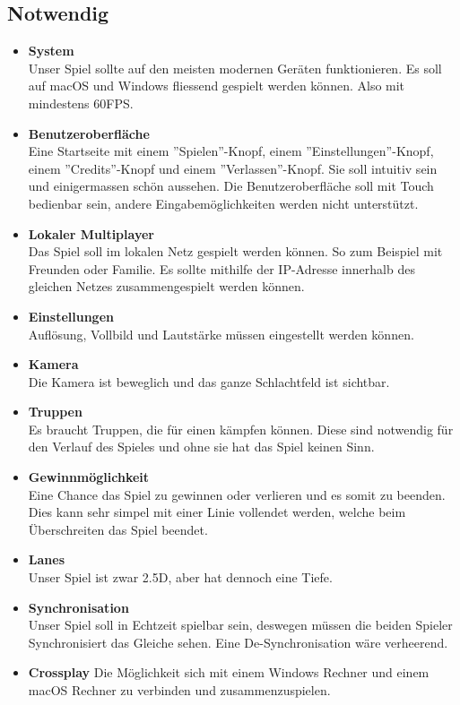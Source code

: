 \subsection{Notwendig}
\begin{itemize}
    \item \textbf{System} \\
        Unser Spiel sollte auf den meisten modernen Geräten funktionieren. Es soll auf macOS und
        Windows fliessend gespielt werden können. Also mit mindestens 60FPS.
    \item \textbf{Benutzeroberfläche} \\
        Eine Startseite mit einem ''Spielen''-Knopf, einem ''Einstellungen''-Knopf, einem
        ''Credits''-Knopf und einem ''Verlassen''-Knopf. Sie soll intuitiv sein und einigermassen
        schön aussehen. Die Benutzeroberfläche soll mit Touch bedienbar sein, andere Eingabemöglichkeiten
        werden nicht unterstützt.
    \item \textbf{Lokaler Multiplayer} \\
        Das Spiel soll im lokalen Netz gespielt werden können. So zum Beispiel mit Freunden oder Familie.
        Es sollte mithilfe der IP-Adresse innerhalb des gleichen Netzes zusammengespielt werden können.
    \item \textbf{Einstellungen} \\
        Auflösung, Vollbild und Lautstärke müssen eingestellt werden können.
    \item \textbf{Kamera} \\
        Die Kamera ist beweglich und das ganze Schlachtfeld ist sichtbar.
    \item \textbf{Truppen} \\
        Es braucht Truppen, die für einen kämpfen können. Diese sind notwendig für den Verlauf des Spieles
        und ohne sie hat das Spiel keinen Sinn.
    \item \textbf{Gewinnmöglichkeit} \\
        Eine Chance das Spiel zu gewinnen oder verlieren und es somit zu beenden. Dies kann sehr simpel
        mit einer Linie vollendet werden, welche beim Überschreiten das Spiel beendet.
    \item \textbf{Lanes} \\
        Unser Spiel ist zwar 2.5D, aber hat dennoch eine Tiefe.
    \item \textbf{Synchronisation} \\
        Unser Spiel soll in Echtzeit spielbar sein, deswegen müssen die beiden Spieler Synchronisiert das Gleiche sehen. Eine De-Synchronisation wäre verheerend. 
    \item \textbf{Crossplay}
        Die Möglichkeit sich mit einem Windows Rechner und einem macOS Rechner zu verbinden und zusammenzuspielen.
\end{itemize}

